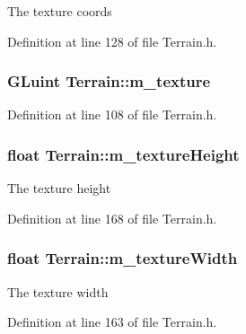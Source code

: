 The texture coords 



Definition at line 128 of file Terrain.\+h.

\subsubsection[{\texorpdfstring{m\+\_\+texture}{m_texture}}]{\setlength{\rightskip}{0pt plus 5cm}G\+Luint Terrain\+::m\+\_\+texture\hspace{0.3cm}{\ttfamily [private]}}\hypertarget{class_terrain_a25a5fe052a78f2a709b8f8ee8f349a6f}{}\label{class_terrain_a25a5fe052a78f2a709b8f8ee8f349a6f}


Definition at line 108 of file Terrain.\+h.

\subsubsection[{\texorpdfstring{m\+\_\+texture\+Height}{m_textureHeight}}]{\setlength{\rightskip}{0pt plus 5cm}float Terrain\+::m\+\_\+texture\+Height\hspace{0.3cm}{\ttfamily [private]}}\hypertarget{class_terrain_a9948162d1367386c8f2ecf519896647b}{}\label{class_terrain_a9948162d1367386c8f2ecf519896647b}


The texture height 



Definition at line 168 of file Terrain.\+h.

\subsubsection[{\texorpdfstring{m\+\_\+texture\+Width}{m_textureWidth}}]{\setlength{\rightskip}{0pt plus 5cm}float Terrain\+::m\+\_\+texture\+Width\hspace{0.3cm}{\ttfamily [private]}}\hypertarget{class_terrain_af50f157cbe53fd1632c79db52d1068f5}{}\label{class_terrain_af50f157cbe53fd1632c79db52d1068f5}


The texture width 



Definition at line 163 of file Terrain.\+h.

